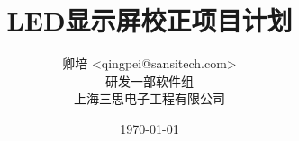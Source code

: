 \title{\textbf{LED显示屏校正项目计划}}

\author{
        卿培 <qingpei@sansitech.com> \\
         研发一部软件组\\
        上海三思电子工程有限公司
}

\date{\today}
